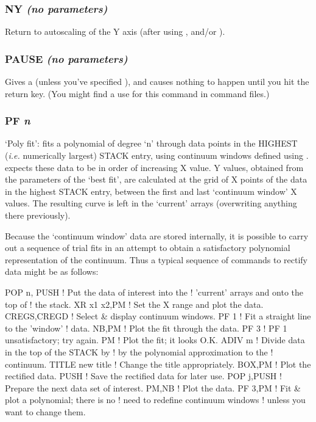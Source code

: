\documentclass[twoside,11pt,noabs,nolof]{starlink}
\providecommand{\dipcom}[3]{\subsubsection*{\label{COM:#1}\textbf{#1} \emph{#2}}}
\begin{document}
\dipcom{NY}{(no parameters)}{Returns to auto-scaling of the Y axis}
Return to autoscaling of the Y axis (after using ,    and/or ).

\dipcom{PAUSE}{(no parameters)}{Pauses until the <RETURN> key is hit}
Gives a   (unless you've specified ),  and causes nothing to
happen until you hit the return key. (You might find a use for this
command in command files.)

\dipcom{PF}{n}{Fits a polynomial through the data in the windows defined by {\texttt{CREGS}}}
`Poly fit': fits a polynomial of degree `n' through data points in the
HIGHEST (\emph{i.e.} numerically largest) STACK entry, using continuum
windows defined using .    expects these data to be in order of
increasing X value. Y values, obtained from the parameters of the
`best fit', are calculated at the grid of X points of the data in the
highest STACK entry, between the first and last `continuum window' X
values. The resulting curve is left in the `current' arrays
(overwriting anything there previously).

Because the `continuum window' data are stored internally, it is
possible to carry out a sequence of trial fits in an attempt to obtain
a satisfactory polynomial representation of the continuum. Thus a
typical sequence of commands to rectify data might be as follows:

\begin{terminalv}
POP n, PUSH       ! Put the  data  of  interest  into  the
                  ! 'current'  arrays and onto the top  of
                  ! the stack.
XR x1 x2,PM       ! Set the X range and plot the data.
CREGS,CREGD       ! Select & display  continuum windows.
PF 1              ! Fit  a  straight line to the  'window'
                  ! data.
NB,PM             ! Plot the fit through the data.
PF 3              ! PF 1 unsatisfactory; try again.
PM                ! Plot the fit; it looks O.K.
ADIV m            ! Divide data in the top of the STACK by
                  ! by the polynomial approximation to the
                  ! continuum.
TITLE new title   ! Change the title appropriately.
BOX,PM            ! Plot the rectified data.
PUSH              ! Save the rectified data for later use.
POP j,PUSH        ! Prepare the next data set of interest.
PM,NB             ! Plot the data.
PF 3,PM           ! Fit & plot a polynomial; there is  no
                  ! need  to  redefine  continuum  windows
                  ! unless you want to change them.
\end{terminalv}
\end{document}
